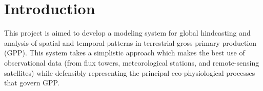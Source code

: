 %
%
%
%
%
\section{Introduction}
\label{sec:intro}
This project is aimed to develop a modeling system for global hindcasting and analysis of spatial and temporal patterns in terrestrial gross primary production (GPP).  
This system takes a simplistic approach which makes the best use of observational data (from flux towers, meteorological stations, and remote-sensing satellites) while defensibly representing the principal eco-physiological processes that govern GPP.  

